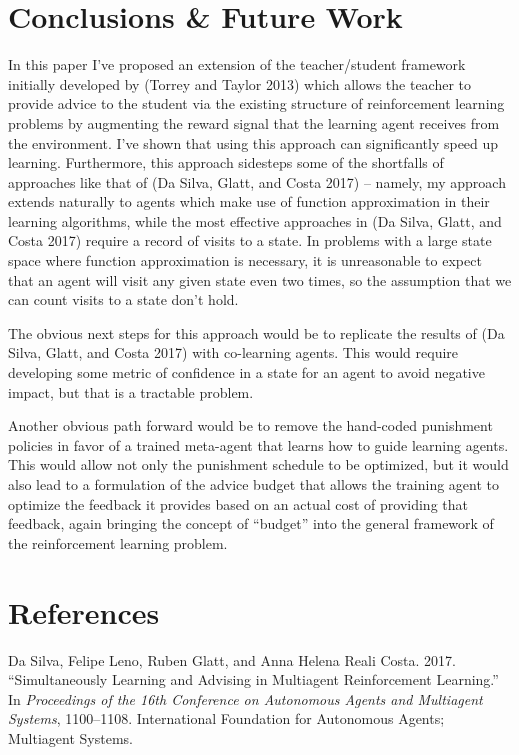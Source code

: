 \documentclass[twocolumn]{article}
\begin{document}
\hypertarget{conclusions-future-work}{\section{Conclusions \& Future Work}\label{conclusions-future-work}}

In this paper I've proposed an extension of the teacher/student
framework initially developed by (Torrey and Taylor 2013) which allows
the teacher to provide advice to the student via the existing structure
of reinforcement learning problems by augmenting the reward signal that
the learning agent receives from the environment. I've shown that using
this approach can significantly speed up learning. Furthermore, this
approach sidesteps some of the shortfalls of approaches like that of (Da
Silva, Glatt, and Costa 2017) -- namely, my approach extends naturally
to agents which make use of function approximation in their learning
algorithms, while the most effective approaches in (Da Silva, Glatt, and
Costa 2017) require a record of visits to a state. In problems with a
large state space where function approximation is necessary, it is
unreasonable to expect that an agent will visit any given state even two
times, so the assumption that we can count visits to a state don't hold.

The obvious next steps for this approach would be to replicate the
results of (Da Silva, Glatt, and Costa 2017) with co-learning agents.
This would require developing some metric of confidence in a state for
an agent to avoid negative impact, but that is a tractable problem.

Another obvious path forward would be to remove the hand-coded
punishment policies in favor of a trained meta-agent that learns how to
guide learning agents. This would allow not only the punishment schedule
to be optimized, but it would also lead to a formulation of the advice
budget that allows the training agent to optimize the feedback it
provides based on an actual cost of providing that feedback, again
bringing the concept of ``budget'' into the general framework of the
reinforcement learning problem.

\hypertarget{references}{\section*{References}\label{references}}

\hypertarget{refs}{}
\leavevmode\hypertarget{ref-da2017simultaneously}{}Da Silva, Felipe Leno, Ruben Glatt, and Anna Helena Reali Costa. 2017.
``Simultaneously Learning and Advising in Multiagent Reinforcement
Learning.'' In \emph{Proceedings of the 16th Conference on Autonomous
Agents and Multiagent Systems}, 1100--1108. International Foundation for
Autonomous Agents; Multiagent Systems.
\end{document}
